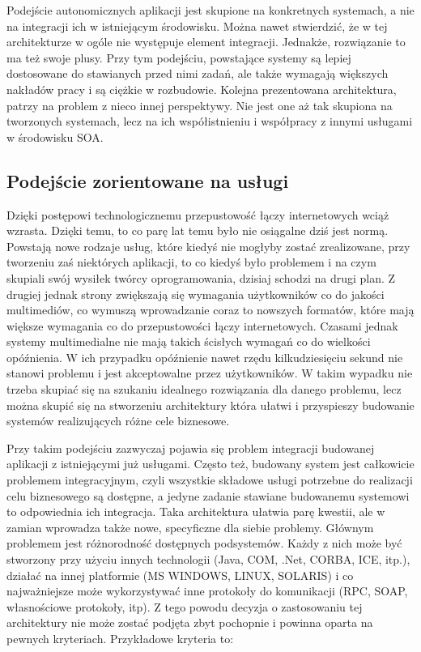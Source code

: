 Podejście autonomicznych aplikacji jest  skupione na konkretnych systemach, a nie na integracji ich w istniejącym środowisku. Można nawet stwierdzić, że w tej architekturze w ogóle nie występuje element integracji. Jednakże, rozwiązanie to ma też swoje plusy. Przy tym podejściu, powstające systemy są lepiej dostosowane do stawianych przed nimi zadań, ale także wymagają większych nakładów pracy i są ciężkie w rozbudowie. Kolejna prezentowana architektura,  patrzy na problem z nieco innej perspektywy. Nie jest one aż tak  skupiona na tworzonych systemach, lecz na ich współistnieniu i współpracy z innymi usługami w środowisku SOA.

\subsection {Podejście zorientowane na usługi}
Dzięki postępowi technologicznemu przepustowość łączy internetowych wciąż wzrasta. Dzięki temu, to co parę lat temu było nie osiągalne dziś jest normą. Powstają nowe rodzaje usług, które kiedyś nie mogłyby zostać zrealizowane, przy tworzeniu zaś niektórych aplikacji, to co kiedyś było problemem i na czym skupiali swój wysiłek twórcy oprogramowania, dzisiaj schodzi na drugi plan. Z drugiej jednak strony zwiększają się wymagania użytkowników co do jakości multimediów, co wymuszą wprowadzanie coraz to nowszych formatów, które mają większe wymagania co do przepustowości łączy internetowych. Czasami jednak systemy multimedialne nie mają takich ścisłych wymagań co do wielkości opóźnienia. W ich przypadku opóźnienie nawet rzędu kilkudziesięciu sekund nie stanowi problemu i jest akceptowalne przez użytkowników. W takim wypadku nie trzeba skupiać się na szukaniu idealnego rozwiązania dla danego problemu, lecz można skupić się na stworzeniu architektury która ułatwi i przyspieszy budowanie systemów realizujących różne cele biznesowe.

Przy takim podejściu zazwyczaj pojawia się problem integracji budowanej aplikacji z istniejącymi już usługami. Często też, budowany system jest całkowicie problemem integracyjnym, czyli wszystkie składowe usługi potrzebne do realizacji celu biznesowego są dostępne, a jedyne zadanie stawiane budowanemu systemowi to odpowiednia ich integracja. Taka architektura ułatwia parę kwestii, ale w zamian wprowadza także nowe, specyficzne dla siebie problemy. Głównym problemem jest różnorodność dostępnych podsystemów. Każdy z nich może być stworzony przy użyciu innych technologii (Java, COM, .Net, CORBA, ICE, itp.), działać na innej platformie (MS WINDOWS, LINUX, SOLARIS) i co najważniejsze może wykorzystywać inne protokoły do komunikacji (RPC, SOAP, własnościowe protokoły, itp). Z tego powodu decyzja o zastosowaniu tej architektury nie może zostać podjęta zbyt pochopnie i powinna oparta na pewnych kryteriach. Przykładowe kryteria to:  \cite{hohpewoolf2003} 

